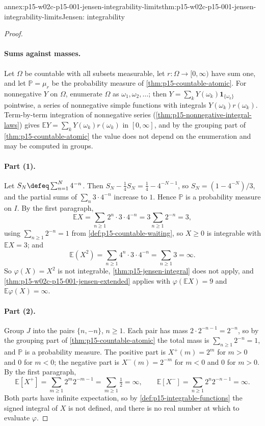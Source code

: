 \begin{annexitem}{annex:p15-w02c-p15-001-jensen-integrability-limits}{thm:p15-w02c-p15-001-jensen-integrability-limits}{Jensen: integrability}
\begin{proof}
\paragraph{Sums against masses.}
Let \(\Omega\) be countable with all subsets measurable, let
\(r:\Omega\to[0,\infty)\) have sum one, and let \(\mathbb P=\mu_r\) be the
probability measure of \cref{thm:p15-countable-atomic}. For nonnegative
\(Y\) on \(\Omega\), enumerate \(\Omega\) as \(\omega_1,\omega_2,\ldots\);
then \(Y=\sum_kY(\omega_k)\mathbf1_{\{\omega_k\}}\) pointwise, a series of
nonnegative simple functions with integrals \(Y(\omega_k)r(\omega_k)\).
Term-by-term integration of nonnegative series
(\cref{thm:p15-nonnegative-integral-laws}) gives
\(\mathbb EY=\sum_kY(\omega_k)r(\omega_k)\) in \([0,\infty]\), and by
the grouping part of \cref{thm:p15-countable-atomic} the value does not
depend on the enumeration and may be computed in groups.

\paragraph{Part (1).}
Let \(S_N\defeq\sum_{n=1}^N4^{-n}\). Then
\(S_N-\tfrac14S_N=\tfrac14-4^{-N-1}\), so \(S_N=(1-4^{-N})/3\), and the
partial sums of \(\sum_n3\cdot4^{-n}\) increase to \(1\). Hence
\(\mathbb P\) is a probability measure on \(I\). By the first paragraph,
\[
 \mathbb EX=\sum_{n\geq1}2^n\cdot3\cdot4^{-n}=3\sum_{n\geq1}2^{-n}=3,
\]
using \(\sum_{n\geq1}2^{-n}=1\) from \cref{def:p15-countable-waiting},
so \(X\geq0\) is integrable with \(\mathbb EX=3\); and
\[
 \mathbb E(X^2)=\sum_{n\geq1}4^n\cdot3\cdot4^{-n}=\sum_{n\geq1}3=\infty .
\]
So \(\varphi(X)=X^2\) is not integrable,
\cref{thm:p15-jensen-integral} does not apply, and
\cref{thm:p15-w02c-p15-001-jensen-extended} applies with
\(\varphi(\mathbb EX)=9\) and \(\mathbb E\varphi(X)=\infty\).

\paragraph{Part (2).}
Group \(J\) into the pairs \(\{n,-n\}\), \(n\geq1\). Each pair has mass
\(2\cdot2^{-n-1}=2^{-n}\), so by the grouping part of
\cref{thm:p15-countable-atomic} the total mass is
\(\sum_{n\geq1}2^{-n}=1\), and \(\mathbb P\) is a probability measure. The
positive part is \(X^+(m)=2^m\) for \(m>0\) and \(0\) for \(m<0\); the
negative part is \(X^-(m)=2^{-m}\) for \(m<0\) and \(0\) for \(m>0\). By
the first paragraph,
\[
 \mathbb E[X^+]=\sum_{m\geq1}2^m2^{-m-1}=\sum_{m\geq1}\tfrac12=\infty,
 \qquad
 \mathbb E[X^-]=\sum_{n\geq1}2^n2^{-n-1}=\infty .
\]
Both parts have infinite expectation, so by
\cref{def:p15-integrable-functions} the signed integral of \(X\) is not
defined, and there is no real number at which to evaluate \(\varphi\).
\end{proof}
\end{annexitem}
